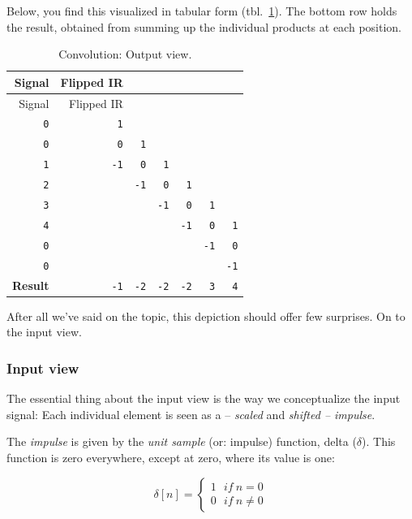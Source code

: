 \documentclass[
  letterpaper,
]{krantz}
\begin{document}
Below, you find this visualized in tabular form
(tbl.~\ref{tbl-convolution-output}). The bottom row holds the result,
obtained from summing up the individual products at each position.

\hypertarget{tbl-convolution-output}{}
\begin{longtable}[]{@{}rrrrrrr@{}}
\caption{\label{tbl-convolution-output}Convolution: Output
view.}\tabularnewline
\toprule\noalign{}
Signal & Flipped IR & & & & & \\
\midrule\noalign{}
\endfirsthead
\toprule\noalign{}
Signal & Flipped IR & & & & & \\
\midrule\noalign{}
\endhead
\bottomrule\noalign{}
\endlastfoot
\texttt{0} & \texttt{1} & & & & & \\
\texttt{0} & \texttt{0} & \texttt{1} & & & & \\
\texttt{1} & \texttt{-1} & \texttt{0} & \texttt{1} & & & \\
\texttt{2} & & \texttt{-1} & \texttt{0} & \texttt{1} & & \\
\texttt{3} & & & \texttt{-1} & \texttt{0} & \texttt{1} & \\
\texttt{4} & & & & \texttt{-1} & \texttt{0} & \texttt{1} \\
\texttt{0} & & & & & \texttt{-1} & \texttt{0} \\
\texttt{0} & & & & & & \texttt{-1} \\
\textbf{Result} & \texttt{-1} & \texttt{-2} & \texttt{-2} & \texttt{-2}
& \texttt{3} & \texttt{4} \\
\end{longtable}

After all we've said on the topic, this depiction should offer few
surprises. On to the input view.

\hypertarget{input-view}{%
\subsubsection{Input view}\label{input-view}}

The essential thing about the input view is the way we conceptualize the
input signal: Each individual element is seen as a -- \emph{scaled} and
\emph{shifted -- impulse}.

The \emph{impulse} is given by the \emph{unit sample} (or: impulse)
function, delta (\(\delta\)). This function is zero everywhere, except
at zero, where its value is one:

\[
\delta [n]={\begin{cases}1\ \ \ if \ n=0\\0\ \ \ if \ n \ne 0\end{cases}}
\]
\end{document}
